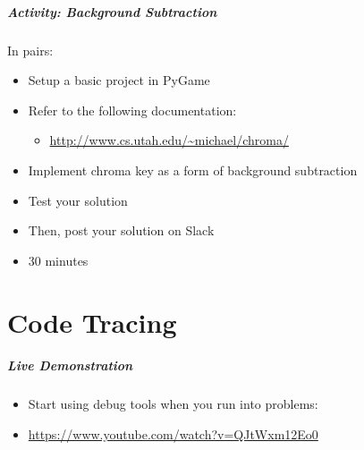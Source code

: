 \begin{frame}
	\frametitle{Activity: Background Subtraction}
	
	In pairs:
	
	\vspace{2em}
	
	\begin{itemize}		
		\item Setup a basic project in PyGame
		\item Refer to the following documentation:
		\begin{itemize}
			\item \url{http://www.cs.utah.edu/~michael/chroma/}
		\end{itemize}
		\item Implement chroma key as a form of background subtraction
		\item Test your solution
		\item Then, post your solution on Slack
		\item 30 minutes
	\end{itemize}
\end{frame}

\part{Code Tracing}
\frame{\partpage}

\begin{frame}
	\frametitle{Live Demonstration}
	
	\begin{itemize}		
		\item Start using debug tools when you run into problems:
		\item \url{https://www.youtube.com/watch?v=QJtWxm12Eo0}
	\end{itemize}
\end{frame}


